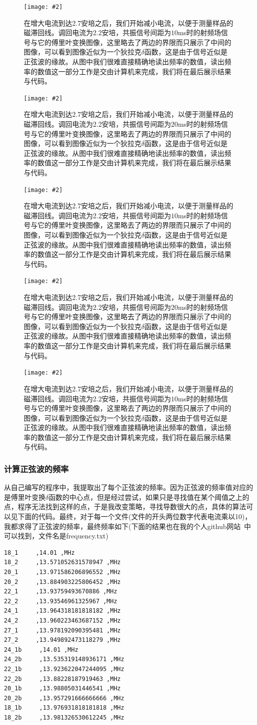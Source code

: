\documentclass{ctexart}
\newcommand{\cpic}[2]{
\begin{center}
\texttt{[image: \#2]}
\end{center}
}
\newcommand{\cpicn}[3]
{
\begin{figure}[H]
\cpic{#1}{#2}
\caption{#3\label{#2}}
\end{figure}
}
\begin{document}
\cpicn{0.5}{22_2b}{在增大电流到达2.7安培之后，我们开始减小电流，以便于测量样品的磁滞回线。调回电流为2.2安培，共振信号间距为$10$ms时的射频场信号与它的傅里叶变换图像，这里略去了两边的界限而只展示了中间的图像，可以看到图像近似为一个狄拉克$\delta$函数，这是由于信号近似是正弦波的缘故。从图中我们很难直接精确地读出频率的数值，读出频率的数值这一部分工作是交由计算机来完成，我们将在最后展示结果与代码。}
\cpicn{0.5}{20_1b}{在增大电流到达2.7安培之后，我们开始减小电流，以便于测量样品的磁滞回线。调回电流为2.2安培，共振信号间距为$20$ms时的射频场信号与它的傅里叶变换图像，这里略去了两边的界限而只展示了中间的图像，可以看到图像近似为一个狄拉克$\delta$函数，这是由于信号近似是正弦波的缘故。从图中我们很难直接精确地读出频率的数值，读出频率的数值这一部分工作是交由计算机来完成，我们将在最后展示结果与代码。}
\cpicn{0.5}{20_2b}{在增大电流到达2.7安培之后，我们开始减小电流，以便于测量样品的磁滞回线。调回电流为2.2安培，共振信号间距为$10$ms时的射频场信号与它的傅里叶变换图像，这里略去了两边的界限而只展示了中间的图像，可以看到图像近似为一个狄拉克$\delta$函数，这是由于信号近似是正弦波的缘故。从图中我们很难直接精确地读出频率的数值，读出频率的数值这一部分工作是交由计算机来完成，我们将在最后展示结果与代码。}
\cpicn{0.5}{18_1b}{在增大电流到达2.7安培之后，我们开始减小电流，以便于测量样品的磁滞回线。调回电流为2.2安培，共振信号间距为$20$ms时的射频场信号与它的傅里叶变换图像，这里略去了两边的界限而只展示了中间的图像，可以看到图像近似为一个狄拉克$\delta$函数，这是由于信号近似是正弦波的缘故。从图中我们很难直接精确地读出频率的数值，读出频率的数值这一部分工作是交由计算机来完成，我们将在最后展示结果与代码。}
\cpicn{0.5}{18_2b}{在增大电流到达2.7安培之后，我们开始减小电流，以便于测量样品的磁滞回线。调回电流为2.2安培，共振信号间距为$10$ms时的射频场信号与它的傅里叶变换图像，这里略去了两边的界限而只展示了中间的图像，可以看到图像近似为一个狄拉克$\delta$函数，这是由于信号近似是正弦波的缘故。从图中我们很难直接精确地读出频率的数值，读出频率的数值这一部分工作是交由计算机来完成，我们将在最后展示结果与代码。}
\subsubsection{计算正弦波的频率}
从自己编写的程序中，我提取出了每个正弦波的频率。因为正弦波的频率值对应的是傅里叶变换$\delta$函数的中心点，但是经过尝试，如果只是寻找值在某个阈值之上的点，程序无法找到这样的点，于是我改变策略，寻找导数很大的点，具体的算法可以见下面的代码。最终，对于每一个文件(文件的开头两位数字代表电流乘以10)，我都求得了正弦波的频率，最终频率如下(下面的结果也在我的个人github网站~\cite{git_xu}中可以找到，文件名是frequency.txt)
\begin{lstlisting}
18_1     ,14.01 ,MHz
18_2     ,13.571052631578947 ,MHz
20_1     ,13.971586206896552 ,MHz
20_2     ,13.884903225806452 ,MHz
22_1     ,13.93759493670886 ,MHz
22_2     ,13.93546961325967 ,MHz
24_1     ,13.964318181818182 ,MHz
24_2     ,13.960223463687152 ,MHz
27_1     ,13.978192090395481 ,MHz
27_2     ,13.949892473118279 ,MHz
24_1b     ,14.01 ,MHz
24_2b     ,13.535319148936171 ,MHz
22_1b     ,13.923622047244095 ,MHz
22_2b     ,13.88228187919463 ,MHz
20_1b     ,13.98805031446541 ,MHz
20_2b     ,13.957291666666666 ,MHz
18_1b     ,13.976931818181818 ,MHz
18_2b     ,13.981326530612245 ,MHz
\end{lstlisting}
\end{document}
